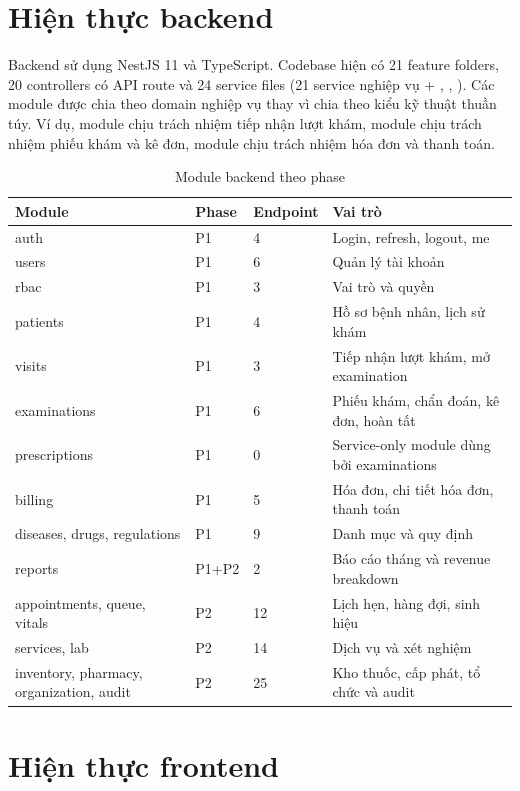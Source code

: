 \section{Hiện thực backend}

Backend sử dụng NestJS 11 và TypeScript. Codebase hiện có 21 feature folders, 20 controllers có API route và 24 service files (21 service nghiệp vụ + , , ). Các module được chia theo domain nghiệp vụ thay vì chia theo kiểu kỹ thuật thuần túy. Ví dụ, module  chịu trách nhiệm tiếp nhận lượt khám, module  chịu trách nhiệm phiếu khám và kê đơn, module  chịu trách nhiệm hóa đơn và thanh toán.

\begin{longtable}{|p{3.2cm}|p{2cm}|p{2.5cm}|p{6cm}|}
\caption{Module backend theo phase}\\
\hline
\textbf{Module} & \textbf{Phase} & \textbf{Endpoint} & \textbf{Vai trò} \\
\hline
auth & P1 & 4 & Login, refresh, logout, me \\
\hline
users & P1 & 6 & Quản lý tài khoản \\
\hline
rbac & P1 & 3 & Vai trò và quyền \\
\hline
patients & P1 & 4 & Hồ sơ bệnh nhân, lịch sử khám \\
\hline
visits & P1 & 3 & Tiếp nhận lượt khám, mở examination \\
\hline
examinations & P1 & 6 & Phiếu khám, chẩn đoán, kê đơn, hoàn tất \\
\hline
prescriptions & P1 & 0 & Service-only module dùng bởi examinations \\
\hline
billing & P1 & 5 & Hóa đơn, chi tiết hóa đơn, thanh toán \\
\hline
diseases, drugs, regulations & P1 & 9 & Danh mục và quy định \\
\hline
reports & P1+P2 & 2 & Báo cáo tháng và revenue breakdown \\
\hline
appointments, queue, vitals & P2 & 12 & Lịch hẹn, hàng đợi, sinh hiệu \\
\hline
services, lab & P2 & 14 & Dịch vụ và xét nghiệm \\
\hline
inventory, pharmacy, organization, audit & P2 & 25 & Kho thuốc, cấp phát, tổ chức và audit \\
\hline
\end{longtable}

\section{Hiện thực frontend}

